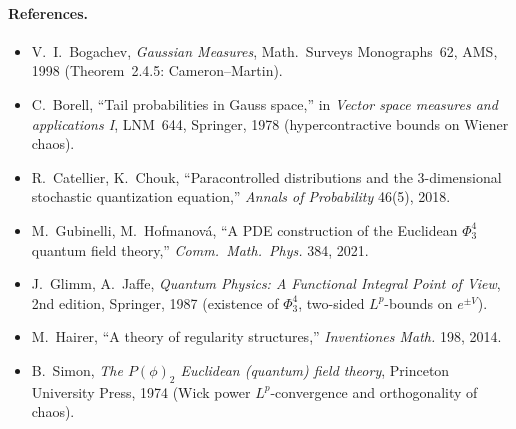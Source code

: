 \documentclass[12pt]{article}
\theoremstyle{definition}
\begin{document}
\paragraph{References.}
\begin{itemize}
\item[\cite{Bogachev}] V.~I.~Bogachev, \emph{Gaussian Measures}, Math.\ Surveys
Monographs~62, AMS, 1998 (Theorem~2.4.5: Cameron--Martin).
\item[\cite{Borell}] C.~Borell, ``Tail probabilities in Gauss space,'' in
\emph{Vector space measures and applications I}, LNM~644, Springer, 1978 (hypercontractive
bounds on Wiener chaos).
\item[\cite{CatellierChouk}] R.~Catellier, K.~Chouk, ``Paracontrolled distributions and
the 3-dimensional stochastic quantization equation,'' \emph{Annals of Probability} 46(5),
2018.
\item[\cite{GH}] M.~Gubinelli, M.~Hofmanov\'a, ``A PDE construction of the Euclidean
$\Phi^4_3$ quantum field theory,'' \emph{Comm.\ Math.\ Phys.} 384, 2021.
\item[\cite{GlimmJaffe}] J.~Glimm, A.~Jaffe, \emph{Quantum Physics: A Functional Integral
Point of View}, 2nd edition, Springer, 1987 (existence of $\Phi^4_3$, two-sided
$L^p$-bounds on $e^{\pm V}$).
\item[\cite{HairerRS}] M.~Hairer, ``A theory of regularity structures,''
\emph{Inventiones Math.} 198, 2014.
\item[\cite{Simon}] B.~Simon, \emph{The $P(\phi)_2$ Euclidean (quantum) field theory},
Princeton University Press, 1974 (Wick power $L^p$-convergence and orthogonality of
chaos).
\end{itemize}
\end{document}
